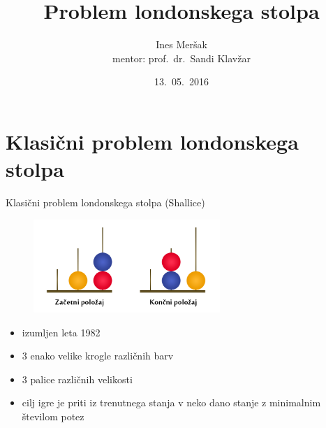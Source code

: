 \documentclass{beamer}
\title{Problem londonskega stolpa}
\author[Ines Meršak]{Ines Meršak \\[5px] mentor: prof.~dr.~Sandi Klavžar}
\date{13.~05.~2016}
\begin{document}
    
\begin{frame}[plain]
    \titlepage
\end{frame}


\section{Klasični problem londonskega stolpa}
\begin{frame}{Klasični problem londonskega stolpa (Shallice)}
    \begin{figure}
        \centering
        \includegraphics[height=100pt]{../img/london-tower.png}
    \end{figure}
    \begin{itemize}
        \item izumljen leta 1982
        \item 3 enako velike krogle različnih barv
        \item 3 palice različnih velikosti
        \item cilj igre je priti iz trenutnega stanja v neko dano stanje z minimalnim številom potez
    \end{itemize}
\end{frame}
\end{document}
